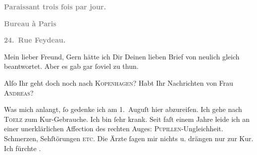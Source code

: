 \pstart
           \begin{otherlanguage}{french}\textcolor{gray}{\textbf{\textbf{Paraissant trois fois par jour.}}}\end{otherlanguage}\pend
           
\pstart
           \begin{otherlanguage}{french}\textcolor{gray}{\textbf{\textbf{Bureau à Paris}}}\end{otherlanguage}\pend
           
\pstart
           \begin{otherlanguage}{french}\textcolor{gray}{\textbf{\textbf{24. Rue Feydeau.}}}\end{otherlanguage}\pend
           
\pstart\center{}Mein lieber Freund,\pend\vspace{0.5em}
\pstart
           Gern hätte ich Dir Deinen lieben Brief von neulich gleich beantwortet. Aber es gab
               gar{ }ſoviel zu thun.\pend
           
\pstart
           Alſo Ihr geht doch noch nach \textsc{Kopenhagen}? Habt Ihr Nachrichten von Frau \textsc{Andreas}?\pend
           
\pstart
           Was mich anlangt,{ }ſo gedenke ich am 1. Auguſt hier
               abzureiſen. Ich gehe nach \textsc{Toelz} zum Kur-Gebrauche. Ich bin{ }ſehr krank. Seit faſt einem Jahre leide ich an einer
               unerklärlichen Affection des rechten Auges: \textsc{Pupillen}-Ungleichheit. Schmerzen, {\pb}Sehſtörungen \textsc{etc}. Die  Ärzte{ }ſagen mir nichts u. drängen nur zur Kur.
               Ich fürchte \label{K_L02741-1v}\label{K_L02741-1}.\pend
           
